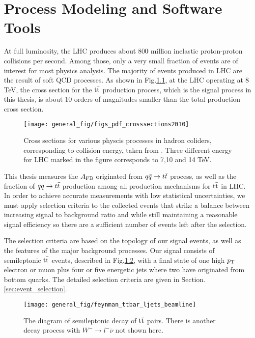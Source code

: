 \chapter{Process Modeling and Software Tools}
\label{sec:modelling}

At full luminosity, the LHC produces about 800 million inelastic proton-proton collisions per second. Among those, only a very small fraction of events are of interest for most physics analysis. The majority of events produced in LHC are the result of soft QCD processes. As shown in Fig.\ref{fig:pp_xsec}, at the LHC operating at 8 TeV, the cross section for the $\ttbar$ production process, which is the signal process in this thesis, is about 10 orders of magnitudes smaller than the total production cross section. 

\begin{figure}
	\centering
	\texttt{[image: general\_fig/figs\_pdf\_crosssections2010]}
	\caption[Cross sections for various physcis processes in hadron coliders]
	{Cross sections for various physcis processes in hadron coliders, corresponding to collision energy, taken from \cite{Plehn:2009nd}. Three different energy for LHC marked in the figure corresponds to 7,10 and 14 TeV.}
	\label{fig:pp_xsec}
\end{figure}

This thesis measures the $A_{\mathrm{FB}}$ originated from $q\bar q \rightarrow t \bar t$ process, as well as the fraction of $q\bar q \rightarrow t \bar t$ production among all production mechanisms for $\ttbar$ in LHC. In order to achieve accurate measurements with low statistical uncertainties, we must apply selection criteria to the collected events that strike a balance between increasing signal to background ratio and while still maintaining a reasonable signal efficiency so there are a sufficient number of events left after the selection.

The selection criteria are based on the topology of our signal events, as well as the features of the major background processes. Our signal consists of semileptonic $\ttbar$ events, described in Fig.\ref{fig:TT_semileptonic_1}, with a final state of one high $p_\mathrm{T}$ electron or muon plus four or five energetic jets where two have originated from bottom quarks. The detailed selection criteria are given in Section.\ref{sec:event_selection}.

\begin{figure}[hbt]
	\begin{center}
		\texttt{[image: general\_fig/feynman\_ttbar\_ljets\_beamline]}
		\caption [The diagram of semileptonic decay of $\ttbar$ pairs.]
		{\small The diagram of semileptonic decay of $\ttbar$ pairs. There is another decay process with $W^-\rightarrow l^-\bar \nu$ not shown here.}
		\label{fig:TT_semileptonic_1}
	\end{center}
\end{figure}

